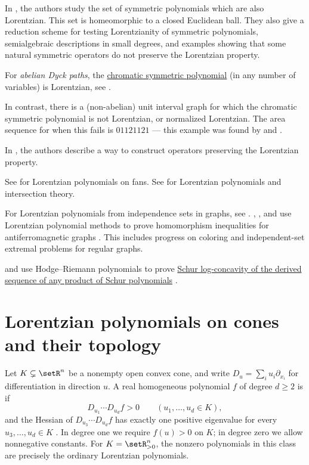 In \cite{ChinQin2025x}, the authors study the set of symmetric polynomials which are also Lorentzian.
This set is homeomorphic to a closed Euclidean ball.  They also give a
reduction scheme for testing Lorentzianity of symmetric polynomials,
semialgebraic descriptions in small degrees, and examples showing that some
natural symmetric operators do not preserve the Lorentzian property.



\begin{example}

For \emph{abelian Dyck paths}, the \hyperref[chromaticQuasisymmetricHistory]{chromatic symmetric polynomial}
(in any number of variables) is Lorentzian, see \cite{MatherneMoralesSelover2022x}.

In contrast, there is a (non-abelian) unit interval graph for which
the chromatic symmetric polynomial is not Lorentzian, or normalized Lorentzian.
The area sequence for when this fails is $01121121$ --- this example was found by
 and .
\end{example}


In \cite{RossSussWannerer2023x}, the authors describe a way to construct operators preserving
the Lorentzian property.

See \cite{BrandenLeake2023x,Ross2023x} for Lorentzian polynomials on fans.
See \cite{HuXiao2023x} for Lorentzian polynomials and intersection theory.


For Lorentzian polynomials from independence sets in graphs,
see \cite{BendjeddouHardiman2025}.
, , and  use
Lorentzian polynomial methods to prove homomorphism inequalities for
antiferromagnetic graphs \cite{LeeOhSeo2025x}.  This includes progress on
coloring and independent-set extremal problems for regular graphs.

 and  use Hodge--Riemann polynomials
to prove \hyperref[derivedSchur]{Schur log-concavity of the derived
sequence of any product of Schur polynomials}
\cite[Cor.~1.12]{LuZheng2025x}.

\section[lorentzianConeTopology]{Lorentzian polynomials on cones and their topology}

Let $K\subsetneq\setR^n$ be a nonempty open convex cone, and write
$D_u=\sum_i u_i\partial_{x_i}$ for differentiation in direction $u$.
A real homogeneous polynomial $f$ of degree $d\geq2$ is
\label{coneLorentzianPolynomial} if
\[
 D_{u_1}\dotsm D_{u_d}f>0\qquad(u_1,\dotsc,u_d\in K),
\]
and the Hessian of $D_{u_3}\dotsm D_{u_d}f$ has exactly one positive
eigenvalue for every $u_3,\dotsc,u_d\in K$
\cite[Def.~2.1]{BrandenLeake2023x}.
In degree one we require $f(u)>0$ on $K$; in degree zero we allow
nonnegative constants. For $K=\setR_{>0}^n$, the nonzero polynomials in
this class are precisely the ordinary Lorentzian polynomials.

